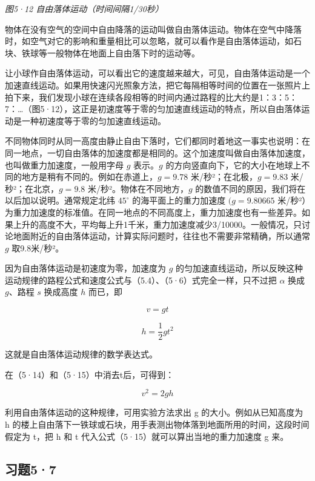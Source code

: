 \emph{图5·12 自由落体运动（时间间隔1/30秒）}

物体在没有空气的空间中自由降落的运动叫做自由落体运动。物体在空气中降落时，如空气对它的影响和重量相比可以忽略，就可以看作是自由落体运动，如石块、铁球等一般物体在地面上自由落下时的运动等。

让小球作自由落体运动，可以看出它的速度越来越大，可见，自由落体运动是一个加速直线运动。如果用快速闪光照象方法，把它每隔相等时间的位置在一张照片上拍下来，我们发现小球在连续各段相等的时间内通过路程的比大约是1：3：5：7：\ldots（图5·12），这正是初速度等于零的匀加速直线运动的特点，所以自由落体运动是一种初速度等于零的匀加速直线运动。

不同物体同时从同一高度由静止自由下落时，它们都同时着地这一事实也说明：在同一地点，一切自由落体的加速度都是相同的。这个加速度叫做自由落体加速度，也叫做重力加速度，一般用字母
\(g\) 表示。\(g\)
的方向竖直向下，它的大小在地球上不同的地方是稍有不同的。例如在赤道上，\(g = 9.78\)
米/秒²；在北极，\(g = 9.83\) 米/秒²；在北京，\(g = 9.8\)
米/秒²。物体在不同地方，\(g\)
的数值不同的原因，我们将在以后加以说明。通常规定北纬 \(45^{\circ}\)
的海平面上的重力加速度 \((g = 9.80665\)
米/秒²）为重力加速度的标准值。在同一地点的不同高度上，重力加速度也有一些差异。如果上升的高度不大，平均每上升1千米，重力加速度减少3/10000。一般情况，只讨论地面附近的自由落体运动，计算实际问题时，往往也不需要非常精确，所以通常
\(g\) 取9.8米/秒²。

因为自由落体运动是初速度为零，加速度为 \(g\)
的匀加速直线运动，所以反映这种运动规律的路程公式和速度公式与（5.4）、（5·6）式完全一样，只不过把
\(\alpha\) 换成 \(g\)、路程 \(s\) 换成高度 \(h\) 而已，即

\[
v = g t \tag {5.14}
\]

\[
h = \frac {1}{2} g t ^ {2} \tag {5.15}
\]

这就是自由落体运动规律的数学表达式。

在（5·14）和（5·15）中消去t后，可得到：

\[
v ^ {2} = 2 g h \tag {5.16}
\]

利用自由落体运动的这种规律，可用实验方法求出 g 的大小。例如从已知高度为
h
的楼上自由落下一铁球或石块，用手表测出物体落到地面所用的时间，这段时间假定为
t，把 h 和 t 代入公式（5·15）就可以算出当地的重力加速度 g 来。

\subsection{习题5·7}\label{ux4e60ux989857}

